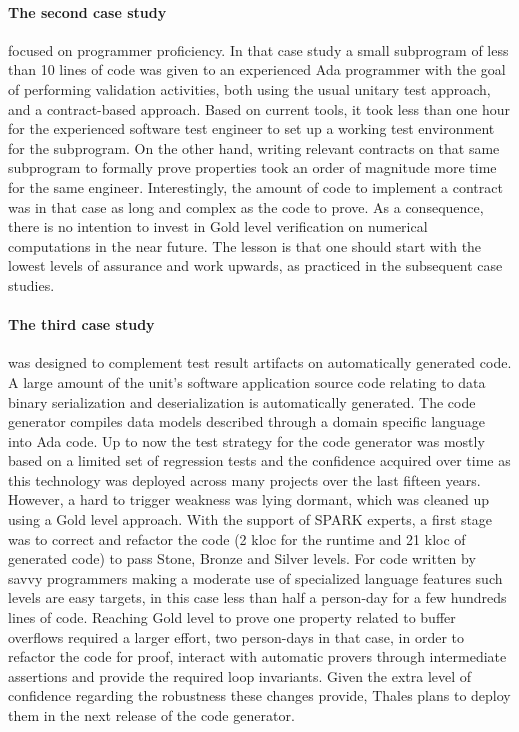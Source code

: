 \documentclass{llncs}
\begin{document}
\paragraph{The second case study} focused on programmer proficiency. In that case study a small
subprogram of less than 10 lines of code was given to an experienced Ada
programmer with the goal of performing validation activities, both using the
usual unitary test approach, and a contract-based approach. Based on current
tools, it took less than one hour for the experienced software test engineer to
set up a working test environment for the subprogram. On the other hand,
writing relevant contracts on that same subprogram to formally prove properties
took an order of magnitude more time for the same engineer. Interestingly, the
amount of code to implement a contract was in that case as long and complex as
the code to prove. As a consequence, there is no
intention to invest in Gold level verification on numerical computations in the
near future. The lesson is that one should start with the lowest levels of
assurance and work upwards, as practiced in the subsequent case studies.

\paragraph{The third case study} was designed to complement test result artifacts on
automatically generated code. A large amount of the unit's software application source
code relating to data binary serialization and deserialization is automatically
generated. The code generator compiles data models described through a domain
specific language into Ada code. Up to now
the test strategy for the code generator was mostly based on a limited set of
regression tests and the confidence acquired over time as this
technology was deployed across many projects over the last fifteen years. However, a hard to
trigger weakness was lying dormant, which was cleaned up using a Gold
level approach. With the support of SPARK experts, a first stage was to correct
and refactor the code (2 kloc for the runtime and 21 kloc of generated code) to
pass Stone, Bronze and Silver levels. For code written by savvy programmers
making a moderate use of specialized language features such levels are easy
targets, in this case less than half a person-day for a few hundreds lines of
code. Reaching Gold level to prove one property related to buffer overflows
required a larger effort, two person-days in that case, in order to refactor
the code for proof, interact with automatic provers through intermediate
assertions and provide the required loop invariants. Given the extra level of
confidence regarding the robustness these changes provide, Thales plans to
deploy them in the next release of the code generator.
\end{document}
